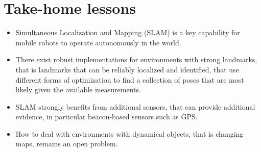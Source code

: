 \section*{Take-home lessons}
\begin{itemize}
\item Simultaneous Localization and Mapping (SLAM) is a key capability for mobile robots to operate autonomously in the world. 
\item There exist robust implementations for environments with strong landmarks, that is landmarks that can be reliably localized and identified, that use   different forms of optimization to find a collection of poses that are most likely given the available measurements. 
\item SLAM strongly benefits from additional sensors, that can provide additional evidence, in particular beacon-based sensors such as GPS.
\item How to deal with environments with dynamical objects, that is changing maps, remains an open problem. 
\end{itemize}  

